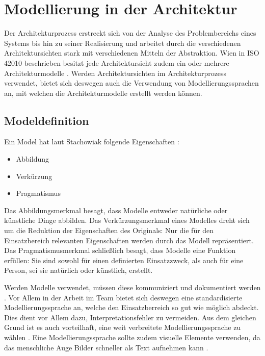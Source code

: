 \chapter{Modellierung in der Architektur}
Der Architekturprozess \glqq erstreckt sich von der Analyse des Problembereichs eines Systems bis hin zu seiner Realisierung\grqq \cite[S. 10]{softarch} und arbeitet durch die verschiedenen Architektursichten stark mit verschiedenen Mitteln der Abstraktion. Wien in ISO 42010 beschrieben besitzt jede Architektursicht zudem ein oder mehrere Architekturmodelle \cite{ISO_ARCH}. Werden Architektursichten im Architekturprozess verwendet, bietet sich deswegen auch die Verwendung von Modellierungssprachen an, mit welchen die Architekturmodelle erstellt werden können.

\section{Modeldefinition}
Ein Model hat laut Stachowiak folgende Eigenschaften \cite[S. 131-133]{modell}:

\begin{itemize}
  \item Abbildung
  \item Verkürzung
  \item Pragmatismus
\end{itemize}

Das Abbildungsmerkmal besagt, dass Modelle entweder natürliche oder künstliche Dinge abbilden. Das Verkürzungsmerkmal eines Modelles dreht sich um die Reduktion der Eigenschaften des Originals: Nur die für den Einsatzbereich relevanten Eigenschaften werden durch das Modell repräsentiert. Das Pragmatismusmerkmal schließlich besagt, dass Modelle eine Funktion erfüllen: Sie sind sowohl für einen definierten Einsatzzweck, als auch für eine Person, sei sie natürlich oder künstlich, erstellt. \cite[S. 131-133]{modell}

Werden Modelle verwendet, müssen diese kommuniziert und dokumentiert werden \cite[S. 12]{reqanalysis}. Vor Allem in der Arbeit im Team bietet sich deswegen eine standardisierte Modellierungssprache an, welche den Einsatzberreich so gut wie möglich abdeckt. Dies dient vor Allem dazu, Interpretationsfehler zu vermeiden. Aus dem gleichen Grund ist es auch vorteilhaft, eine weit verbreitete Modellierungssprache zu wählen \cite[S. 139]{effektiv}. Eine Modellierungssprache sollte zudem visuelle Elemente verwenden, da das menschliche Auge Bilder schneller als Text aufnehmen kann \cite[S. 12]{reqanalysis}.

